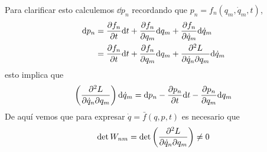 Para clarificar esto calculemos $\dd p_n$ recordando que $p_n=f_n(q_m,\dot{q}_m,t)$,
\begin{align}
  \dd p_n&=\pdv{f_n}{t}\dd t+\pdv{f_n}{q_m}\dd q_m+\pdv{f_n}{\dot{q}_m}\dd \dot{q}_m\\
  &=\pdv{f_n}{t}\dd t+\pdv{f_n}{q_m}\dd q_m+\pdv{L}{\dot{q}_n}{q_m}\dd \dot{q}_m
\end{align}
esto implica que
\begin{equation}
  \left(\pdv{L}{\dot{q}_n}{q_m}\right)\dd \dot{q}_m=\dd p_n-\pdv{p_n}{t}\dd t-\pdv{p_n}{q_m}\dd q_m
\end{equation}
De aquí vemos que para expresar $\dot{q}=\bar{f}(q,p,t)$ es necesario que
\begin{equation}
  \det W_{nm}=\det \left(\pdv{L}{\dot{q}_n}{q_m}\right)\neq 0
\end{equation}


















































